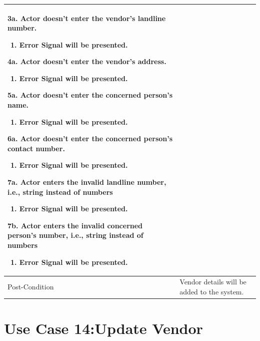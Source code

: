 \documentclass[12pt,a4paper]{article}
\begin{document}
\begin{longtable}{| p{3cm}|p{12cm}|}
3a. Actor doesn't enter the vendor's landline number.
 	\begin{enumerate}
		\item Error Signal will be presented.
	\end{enumerate}
4a. Actor doesn't enter the vendor's address.
 	\begin{enumerate}
		\item Error Signal will be presented.
	\end{enumerate}

5a. Actor doesn't enter the concerned person's name.
 	\begin{enumerate}
		\item Error Signal will be presented.
	\end{enumerate}
6a. Actor doesn't enter the concerned person's contact number.
 	\begin{enumerate}
		\item Error Signal will be presented.
	\end{enumerate}
7a. Actor enters the invalid landline number, i.e., string instead of numbers
	\begin{enumerate}
		\item Error Signal will be presented.
	\end{enumerate}
7b. Actor enters the invalid concerned person's number, i.e., string instead of numbers
	\begin{enumerate}
		\item Error Signal will be presented.
	\end{enumerate}
\\ \hline
Post-Condition &  Vendor details will be added to the system. \\ \hline

\end{longtable}

\section*{Use Case 14:Update Vendor}
\end{document}
